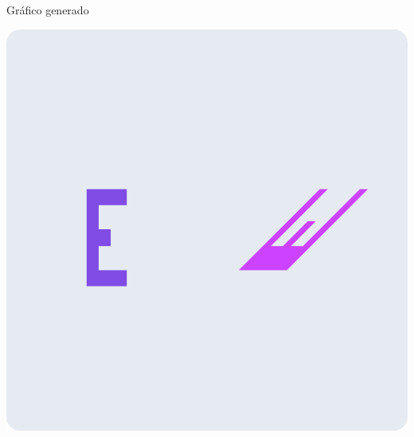 \documentclass[a4paper]{article}
\begin{document}
\newpage
Gráfico generado\\
\begin{center}
\includegraphics[width=16cm]{src/4.png}
\end{center}
\end{document}
